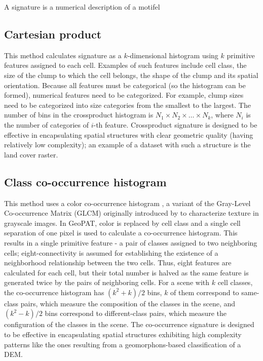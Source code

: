 A signature is a numerical description of a motifel

\subsection{Cartesian product}

This method calculates signature as a $k$-dimensional histogram using $k$ primitive features assigned to each cell. 
Examples of such features include cell class, the size of the clump to which the cell belongs, the shape of the clump and its spatial orientation.  %
Because all features must be categorical (so the histogram can be formed), numerical features need to be categorized. 
For example, clump sizes need to be categorized into size categories from the smallest to the largest.
The number of bins in the crossproduct histogram is $N_1 \times N_2 \times \ldots \times N_k$, where $N_i$ is the number of categories of $i$-th feature. 
Crossproduct signature is designed to be effective in encapsulating spatial structures with clear geometric quality (having relatively low complexity); an example of a dataset with such a structure is the land cover raster.

\subsection{Class co-occurrence histogram}

This method uses a color co-occurrence histogram
, a variant of the Gray-Level Co-occurrence Matrix (GLCM) originally introduced by
to characterize texture in grayscale images.
In GeoPAT, color is replaced by cell class and a single cell separation of one pixel is used to calculate a co-occurrence histogram. 
This results in a single primitive feature - a pair of classes assigned to two neighboring cells; eight-connectivity is assumed for establishing the existence of a neighborhood relationship between the two cells. 
Thus, eight features are calculated for each cell, but their total number is halved as the same feature is generated twice by the pairs of neighboring cells.
For a scene with $k$ cell classes, the co-occurrence histogram has $(k^2+k)/2$ bins, $k$ of them correspond to same-class pairs, which measure the composition of the classes in the scene, and $(k^2-k)/2$ bins correspond to different-class pairs, which measure the configuration of the classes in the scene. 
The co-occurrence signature is designed to be effective in encapsulating spatial structures exhibiting high complexity patterns like the ones resulting from a geomorphons-based classification of a DEM. 

